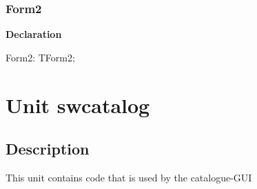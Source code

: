 \documentclass{report}
\newif\ifpdf
\begin{document}
\subsection*{Form2}
\fi
\label{settings-Form2}
\begin{list}{}{
\setlength{\itemindent}{0cm}
\setlength{\listparindent}{0cm}
\setlength{\leftmargin}{\evensidemargin}
\addtolength{\leftmargin}{\tmplength}
\settowidth{\labelsep}{X}
\addtolength{\leftmargin}{\labelsep}
\setlength{\labelwidth}{\tmplength}
}
\item[\textbf{Declaration}\hfill]
\ifpdf
\begin{flushleft}
\fi
\begin{ttfamily}
Form2: TForm2;\end{ttfamily}

\ifpdf
\end{flushleft}
\fi

\end{list}
\chapter{Unit swcatalog}
\label{swcatalog}
\section{Description}
This unit contains code that is used by the catalogue{-}GUI
\end{document}
